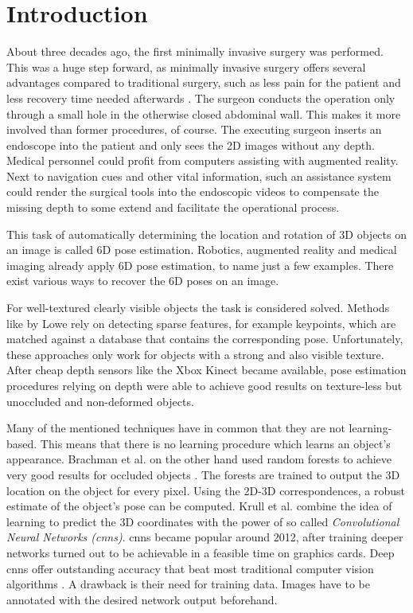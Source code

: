 \chapter{Introduction}

About three decades ago, the first minimally invasive surgery was performed. This was a huge step forward, as minimally invasive surgery offers several advantages compared to traditional surgery, such as less pain for the patient and less recovery time needed afterwards \cite{minimallyinvasive}. The surgeon conducts the operation only through a small hole in the otherwise closed abdominal wall. This makes it more involved than former procedures, of course. The executing surgeon inserts an endoscope into the patient and only sees the 2D images without any depth. Medical personnel could profit from computers assisting with augmented reality. Next to navigation cues and other vital information, such an assistance system could render the surgical tools into the  endoscopic videos to compensate the missing depth to some extend and facilitate the operational process. \

This task of automatically determining the location and rotation of 3D objects on an image is called 6D pose estimation. Robotics, augmented reality and medical imaging already apply 6D pose estimation, to name just a few examples. There exist various ways to recover the 6D poses on an image. 

For well-textured clearly visible objects the task is considered solved. Methods like \cite{dglowe1} by Lowe \etal rely on detecting sparse features, for example keypoints, which are matched against a database that contains the corresponding pose.
Unfortunately, these approaches only work for objects with a strong and also visible texture. After cheap depth sensors like the Xbox Kinect became available, pose estimation procedures relying on depth were able to achieve good results on texture-less but unoccluded and non-deformed objects. 

Many of the mentioned techniques have in common that they are not learning-based. This means that there is no learning procedure which learns an object's appearance. Brachman et al. on the other hand used random forests  to achieve very good results for occluded objects \cite{brachmann1}. The forests are trained to output the 3D location on the object for every pixel. Using the 2D-3D correspondences, a robust estimate of the object's pose can be computed. Krull et al. \cite{akrull} combine the idea of learning to predict the 3D coordinates  with the power of so called \textit{Convolutional Neural Networks (\gls{cnn}s)}. \gls{cnn}s became popular around 2012, after training deeper networks turned out to be achievable in a feasible time on graphics cards. Deep \gls{cnn}s offer outstanding accuracy that beat most traditional computer vision algorithms \cite{ylecun}. A drawback is their need for training data. Images have to be annotated with the desired network output beforehand.


